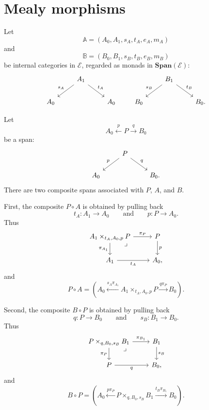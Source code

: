 \section{Mealy morphisms}
\label{sec:mealy-morphisms}

Let
\[
    \mathbb A=(A_0,A_1,s_A,t_A,e_A,m_A)
\]
and
\[
    \mathbb B=(B_0,B_1,s_B,t_B,e_B,m_B)
\]
be internal categories in \(\mathcal E\), regarded as monads in \(\mathbf{Span}(\mathcal E)\):
\[
    \begin{tikzcd}
        & 
            A_1 
                \arrow[dl, "s_A"'] 
                \arrow[dr, "t_A"] 
        & 
        \\
            A_0 
        &
        & 
            A_0
    \end{tikzcd}
    \qquad
    \begin{tikzcd}
        & 
            B_1 
                \arrow[dl, "s_B"'] 
                \arrow[dr, "t_B"] 
        & 
        \\
            B_0 
        &
        & 
            B_0.
    \end{tikzcd}
\]

Let
\[
    A_0\xleftarrow{p}P\xrightarrow{q}B_0
\]
be a span:
\[
    \begin{tikzcd}
        & 
            P 
                \arrow[dl, "p"'] 
                \arrow[dr, "q"] 
        & 
        \\
            A_0 
        &
        & 
            B_0.
    \end{tikzcd}
\]
There are two composite spans associated with \(P\), \(A\), and \(B\).

First, the composite \(P\circ A\) is obtained by pulling back
\[
    t_A:A_1\to A_0
    \qquad
    \text{and}
    \qquad
    p:P\to A_0.
\]
Thus
\[
    \begin{tikzcd}
            A_1\times_{t_A,A_0,p}P
                \arrow[r, "\pi_P"]
                \arrow[d, "\pi_{A_1}"']
                \arrow[dr, phantom, "\lrcorner", very near start]
        &
            P 
                \arrow[d, "p"]
        \\
            A_1 
                \arrow[r, "t_A"']
        &
            A_0,
    \end{tikzcd}
\]
and
\[
    P\circ A
    =
    \left(
        A_0
        \xleftarrow{s_A\pi_{A_1}}
        A_1\times_{t_A,A_0,p}P
        \xrightarrow{q\pi_P}
        B_0
    \right).
\]

Second, the composite \(B\circ P\) is obtained by pulling back
\[
    q:P\to B_0
    \qquad
    \text{and}
    \qquad
    s_B:B_1\to B_0.
\]
Thus
\[
    \begin{tikzcd}
            P\times_{q,B_0,s_B}B_1
                \arrow[r, "\pi_{B_1}"]
                \arrow[d, "\pi_P"']
                \arrow[dr, phantom, "\lrcorner", very near start]
        &
            B_1 
                \arrow[d, "s_B"]
        \\
            P 
                \arrow[r, "q"']
        &
            B_0,
    \end{tikzcd}
\]
and
\[
    B\circ P
    =
    \left(
        A_0
        \xleftarrow{p\pi_P}
        P\times_{q,B_0,s_B}B_1
        \xrightarrow{t_B\pi_{B_1}}
        B_0
    \right).
\]

